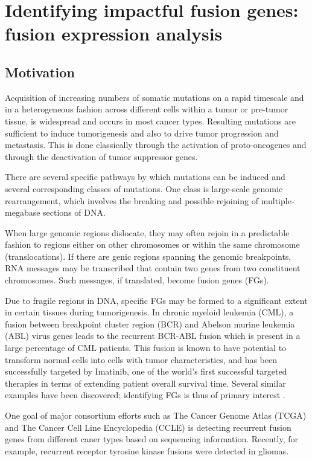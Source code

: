 \chapter{Identifying impactful fusion genes: fusion expression
  analysis}


\section{Motivation}
Acquisition of increasing numbers of somatic mutations on a rapid
timescale and in a heterogeneous fashion across different cells within
a tumor or pre-tumor tissue, is widespread and occurs in most cancer
types. Resulting mutations are sufficient to induce tumorigenesis and
also to drive tumor progression and metastasis. This is done
classically through the activation of proto-oncogenes and through the
deactivation of tumor suppressor genes.


There are several specific pathways by which mutations can be induced
and several corresponding classes of mutations\cite{stratton_cancer_2009}. One class is
large-scale genomic rearrangement, which involves the breaking and
possible rejoining of multiple-megabase sections of DNA.


When large genomic regions dislocate, they may often rejoin in a
predictable fashion to regions either on other chromosomes or within
the same chromosome (translocations).  If there are genic regions
spanning the genomic breakpoints, RNA messages may be transcribed that
contain two genes from two constituent chromosomes. Such messages, if
translated, become fusion genes (FGs).


Due to fragile regions in DNA, specific FGs may be formed to a
significant extent in certain tissues during
tumorigenesis\cite{yunis_constitutive_1984}. In chronic myeloid
leukemia (CML), a fusion between breakpoint cluster region (BCR) and
Abelson murine leukemia (ABL) virus genes leads to the recurrent
BCR-ABL fusion which is present in a large percentage of CML
patients. This fusion is known to have potential to transform normal
cells into cells with tumor characteristics, and has been successfully
targeted by Imatinib, one of the world’s first successful targeted
therapies in terms of extending patient overall survival time. Several
similar examples have been discovered; identifying FGs is thus of
primary interest \cite{chin_cancer_2011}. 

One goal of major consortium efforts such as The Cancer Genome Atlas
(TCGA)\cite{weinstein_cancer_2013} and The Cancer Cell Line
Encyclopedia (CCLE)\cite{barretina_cancer_2012} is detecting recurrent
fusion genes from different caner types based on sequencing
information. Recently, for example, recurrent receptor tyrosine kinase
fusions were detected in gliomas\cite{_comprehensive_2015}.

